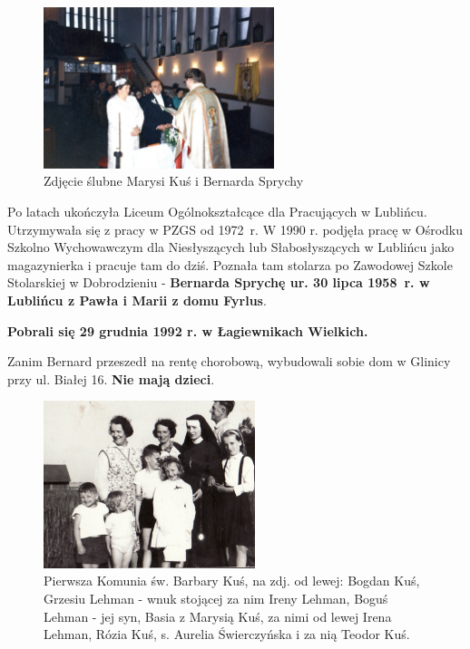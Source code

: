 \begin{figure}[!h]
\begin{center}
\includegraphics[width=0.6\textwidth]{photo/maria_bernard_sprycha_slub.jpg}
\caption{Zdjęcie ślubne Marysi Kuś i Bernarda Sprychy}
\label{rys:maria_bernard_sprycha_slub}
\end{center}
\end{figure}

Po latach ukończyła Liceum Ogólnokształcące dla Pracujących w Lublińcu. Utrzymywała się z pracy w PZGS od 1972~r. W 1990 r. podjęła pracę w Ośrodku Szkolno Wychowawczym dla Niesłyszących lub Słabosłyszących w Lublińcu jako magazynierka i pracuje tam do dziś. Poznała tam stolarza po Zawodowej Szkole Stolarskiej w Dobrodzieniu - \textbf{Bernarda Sprychę ur. 30 lipca 1958~r. w Lublińcu z Pawła i Marii z domu Fyrlus}.

\textbf{Pobrali się 29 grudnia 1992 r. w Łagiewnikach Wielkich.}

Zanim Bernard przeszedł na rentę chorobową, wybudowali sobie dom w Glinicy przy ul. Białej 16. \textbf{Nie mają dzieci}.

\begin{figure}[!h]
\begin{center}
\includegraphics[width=0.55\textwidth]{photo/barbara_kus_komunia.jpg}
\caption[Pierwsza Komunia św. Barbary Kuś]{Pierwsza Komunia św. Barbary Kuś, na zdj. od lewej: Bogdan Kuś, Grzesiu Lehman - wnuk stojącej za nim Ireny Lehman, Boguś Lehman - jej syn, Basia z Marysią Kuś, za nimi od lewej Irena Lehman, Rózia Kuś, s. Aurelia Świerczyńska i za nią Teodor Kuś.}
\label{rys:barbara_kus_komunia}
\end{center}
\end{figure}

